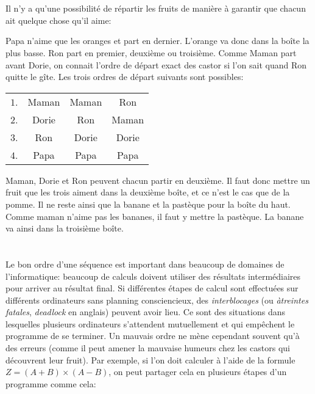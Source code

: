 {{%
\section*{\BrochureSolution}
Il n’y a qu’une possibilité de répartir les fruits de manière à garantir que chacun ait quelque chose qu’il aime:

{\centering%
\par}

Papa n’aime que les oranges et part en dernier. L’orange va donc dans la boîte la plus basse.
Ron part en premier, deuxième ou troisième. Comme Maman part avant Dorie, on connait l’ordre de départ exact des castor si l’on sait quand Ron quitte le gîte. Les trois ordres de départ suivants sont possibles:

{\centering%
\begin{tabular}{ @{} c c c c @{} }
  $1$. & Maman & Maman & Ron \\ 
  $2$. & Dorie & Ron & Maman \\ 
  $3$. & Ron & Dorie & Dorie \\ 
  $4$. & Papa & Papa & Papa
\end{tabular}

\par}

Maman, Dorie et Ron peuvent chacun partir en deuxième. Il faut donc mettre un fruit que les trois aiment dans la deuxième boîte, et ce n’est le cas que de la pomme. Il ne reste ainsi que la banane et la pastèque pour la boîte du haut. Comme maman n’aime pas les bananes, il faut y mettre la pastèque. La banane va ainsi dans la troisième boîte.



\section*{\BrochureItsInformatics}
Le bon ordre d’une séquence est important dans beaucoup de domaines de l’informatique: beaucoup de calculs doivent utiliser des résultats intermédiaires pour arriver au résultat final. Si différentes étapes de calcul sont effectuées sur différents ordinateurs sans planning consciencieux, des \emph{interblocages} (ou \emph{àtreintes fatales}, \emph{deadlock} en anglais) peuvent avoir lieu. Ce sont des situations dans lesquelles plusieurs ordinateurs s’attendent mutuellement et qui empêchent le programme de se terminer.
Un mauvais ordre ne mène cependant souvent qu’à des erreurs (comme il peut amener la mauvaise humeurs chez les castors qui découvrent leur fruit). Par exemple, si l’on doit calculer à l’aide de la formule ${Z = (A+B) \times (A-B)}$, on peut partager cela en plusieurs étapes d’un programme comme cela:

}}
